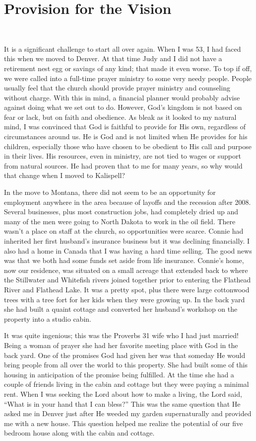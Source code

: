 \documentclass[oneside]{book}
\begin{document}
\section{Provision for the Vision}
\

It is a significant challenge to start all over again. When I was 53, I had faced this when we moved to Denver. At that time Judy and I did not have a retirement nest egg or savings of any kind; that made it even worse. To top if off, we were called into a full-time prayer ministry to some very needy people. People usually feel that the church should provide prayer ministry and counseling without charge. With this in mind, a financial planner would probably advise against doing what we set out to do. However, God’s kingdom is not based on fear or lack, but on faith and obedience. As bleak as it looked to my natural mind, I was convinced that God is faithful to provide for His own, regardless of circumstances around us. He is God and is not limited when He provides for his children, especially those who have chosen to be obedient to His call and purpose in their lives. His resources, even in ministry, are not tied to wages or support from natural sources. He had proven that to me for many years, so why would that change when I moved to Kalispell?

In the move to Montana, there did not seem to be an opportunity for employment anywhere in the area because of layoffs and the recession after 2008. Several businesses, plus most construction jobs, had completely dried up and many of the men were going to North Dakota to work in the oil field. There wasn’t a place on staff at the church, so opportunities were scarce. Connie had inherited her first husband’s insurance business but it was declining financially. I also had a home in Canada that I was having a hard time selling. The good news was that we both had some funds set aside from life insurance. Connie’s home, now our residence, was situated on a small acreage that extended back to where the Stillwater and Whitefish rivers joined together prior to entering the Flathead River and Flathead Lake. It was a pretty spot, plus there were large cottonwood trees with a tree fort for her kids when they were growing up. In the back yard she had built a quaint cottage and converted her husband’s workshop on the property into a studio cabin. 

It was quite ingenious; this was the Proverbs 31 wife who I had just married! Being a woman of prayer she had her favorite meeting place with God in the back yard. One of the promises God had given her was that someday He would bring people from all over the world to this property. She had built some of this housing in anticipation of the promise being fulfilled. At the time she had a couple of friends living in the cabin and cottage but they were paying a minimal rent. When I was seeking the Lord about how to make a living, the Lord said, “What is in your hand that I can bless?” This was the same question that He asked me in Denver just after He weeded my garden supernaturally and provided me with a new house. This question helped me realize the potential of our five bedroom house along with the cabin and cottage.
 
\end{document}
